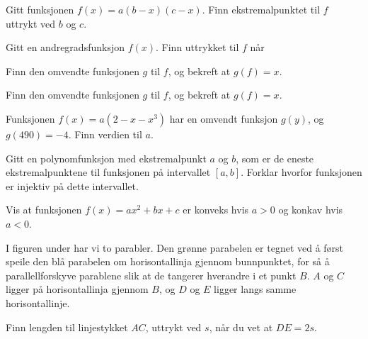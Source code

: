





\opgt

\nes
{}
Gitt funksjonen 
$ f(x)=a(b-x)(c-x) $. Finn ekstremalpunktet til $ f $ uttrykt ved $ b $ og $ c $. 

Gitt en andregradsfunksjon $ f(x) $. Finn uttrykket til $ f $ når

\nes

\nes
{}
Finn den omvendte funksjonen $ g $ til $ f $, og bekreft at $ g(f)=x $. \os
{} \os
{}

Finn den omvendte funksjonen $ g $ til $ f $, og bekreft at $ g(f)=x $. \os
{}



Funksjonen $ f(x)=a(2-x-x^3) $ har en omvendt funksjon $ g(y) $, og $ g(490)= -4$. Finn verdien til $ a $.

\nes
{}
Gitt en polynomfunksjon med ekstremalpunkt $ a $ og $ b $, som er de eneste ekstremalpunktene til funksjonen på intervallet $ [a, b] $. Forklar hvorfor funksjonen er injektiv på dette intervallet.

\newpage
{}
Vis at funksjonen $ {f(x)=a x^2+b x + c}  $ er konveks hvis $ {a>0} $ og konkav hvis $ {a<0} $.

I figuren under har vi to parabler. Den grønne parabelen er tegnet ved å først speile den blå parabelen om horisontallinja gjennom bunnpunktet, for så å parallellforskyve parablene slik at de tangerer hverandre i et punkt $ B $. $ A $ og $ C $ ligger på horisontallinja gjennom $ B $, og $ D $ og $ E $ ligger langs samme horisontallinje.\os

Finn lengden til linjestykket $ AC $, uttrykt ved $ s $, når du vet at $ DE=2s $.
